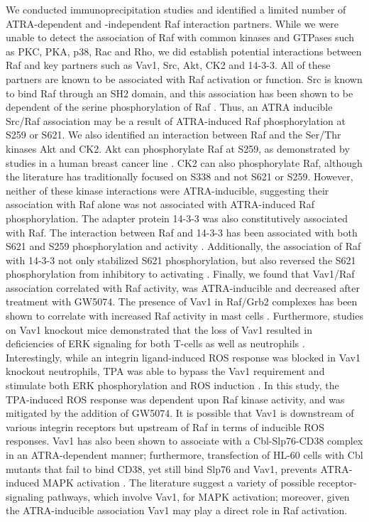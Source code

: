 \documentclass[12pt]{article}
\begin{document}
We conducted immunoprecipitation studies and identified a limited number of ATRA-dependent and -independent Raf interaction partners.
While we were unable to detect the association of Raf with common kinases and GTPases such as PKC, PKA, p38, Rac and Rho,
we did establish potential interactions between Raf and key partners such as Vav1, Src, Akt, CK2 and 14-3-3.
All of these partners are known to be associated with Raf activation or function.
Src is known to bind Raf through an SH2 domain, and this association has been shown to be dependent of the serine phosphorylation of Raf \cite{Cleghon1994}.
Thus, an ATRA inducible Src/Raf association may be a result of ATRA-induced Raf phosphorylation at S259 or S621.
We also identified an interaction between Raf and the Ser/Thr kinases Akt and CK2.
Akt can phosphorylate Raf at S259, as demonstrated by studies in a human breast cancer line \cite{Zimmermann1999}.
CK2 can also phosphorylate Raf, although the literature has traditionally focused on S338 and not S621 or S259\cite{Ritt2007}.
However, neither of these kinase interactions were ATRA-inducible, suggesting their association with Raf alone was not associated with ATRA-induced Raf phosphorylation.
The adapter protein 14-3-3 was also constitutively associated with Raf.
The interaction between Raf and 14-3-3 has been associated with both S621 and S259 phosphorylation and activity \cite{Hekman2004}.
Additionally, the association of Raf with 14-3-3 not only stabilized S621 phosphorylation,
but also reversed the S621 phosphorylation from inhibitory to activating \cite{Dhillon2009}.
Finally, we found that Vav1/Raf association correlated with Raf activity, was ATRA-inducible and decreased after treatment with GW5074.
The presence of Vav1 in Raf/Grb2 complexes has been shown to correlate with increased Raf activity in mast cells \cite{Song1996}.
Furthermore, studies on Vav1 knockout mice demonstrated that the loss of Vav1 resulted in deficiencies
of ERK signaling for both T-cells as well as neutrophils \cite{Costello1999,Graham2007}.
Interestingly, while an integrin ligand-induced ROS response was blocked in Vav1 knockout neutrophils, TPA was able to bypass the Vav1 requirement and stimulate both ERK phosphorylation
and ROS induction \cite{Graham2007}.
In this study, the TPA-induced ROS response was dependent upon Raf kinase activity, and was mitigated by the addition of GW5074.
It is possible that Vav1 is downstream of various integrin receptors but upstream of Raf in terms of inducible ROS responses.
Vav1 has also been shown to associate with a Cbl-Slp76-CD38 complex in an ATRA-dependent manner;
furthermore, transfection of HL-60 cells with Cbl mutants that fail to bind CD38, yet still bind Slp76 and Vav1, prevents
ATRA-induced MAPK activation \cite{Shen2009}.
The literature suggest a variety of possible receptor-signaling pathways, which involve Vav1, for MAPK activation; moreover,
given the ATRA-inducible association Vav1 may play a direct role in Raf activation.
\end{document}
